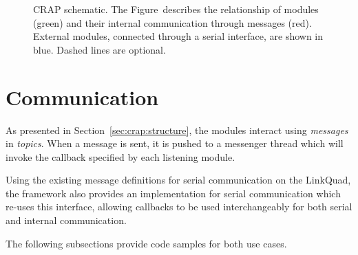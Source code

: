 \begin{figure}[H]
{
        }
        \caption{CRAP schematic. The Figure~describes the relationship of modules (green) and their internal communication through messages (red).
        External modules, connected through a serial interface, are shown in blue. Dashed lines are optional.}
        \label{fig:crap:schematic}
    \end{figure}

    \section{Communication}
    \label{sec:crap:communication}
        As presented in Section~\ref{sec:crap:structure}, the modules interact using
        \textit{messages} in \textit{topics}. When a message is sent, it
        is pushed to a messenger thread which will invoke the callback specified
        by each listening module.

        Using the existing message definitions for serial communication on the LinkQuad,
        the framework also provides an implementation for serial communication
        which re-uses this interface, allowing callbacks to be used interchangeably
        for both serial and internal communication.

        The following subsections provide code samples for both use cases.

